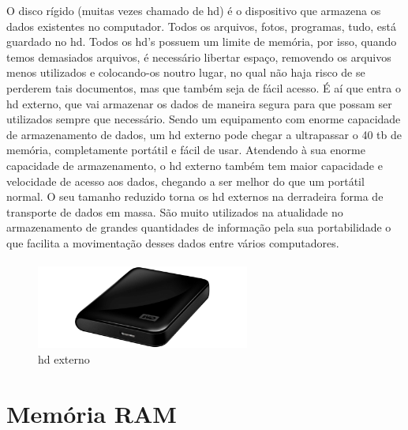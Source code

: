 \documentclass[a4paper]{report}
\begin{document}
O disco rígido (muitas vezes chamado de \ac{hd}) é o dispositivo que armazena os dados existentes no computador. Todos os arquivos, fotos, programas, tudo, está guardado no \ac{hd}. Todos os \ac{hd}’s possuem um limite de memória, por isso, quando temos demasiados arquivos, é necessário libertar espaço, removendo os arquivos menos utilizados e colocando-os noutro lugar, no qual não haja risco de se perderem tais documentos, mas que também seja de fácil acesso. É aí que entra o \ac{hd} externo, que vai armazenar os dados de maneira segura para que possam ser utilizados sempre que necessário.
Sendo um equipamento com enorme capacidade de armazenamento de dados, um \ac{hd} externo pode chegar a ultrapassar o 40 \ac{tb} de memória, completamente portátil e fácil de usar. Atendendo à sua enorme capacidade de armazenamento, o \ac{hd} externo também tem maior capacidade e velocidade de acesso aos dados, chegando a ser melhor do que um portátil normal.
O seu tamanho reduzido torna os \ac{hd} externos na derradeira forma de transporte de dados em massa. 
São muito utilizados na atualidade no armazenamento de grandes quantidades de informação pela sua portabilidade o que facilita a movimentação desses dados entre vários computadores.

\paragraph{}
\paragraph{}
\paragraph{}

\begin{figure}[H]
\center
\includegraphics[width=7cm]{Imagens/discoexterno.png}
\caption{\ac{hd} externo}
\end{figure}

\newpage

\section{Memória RAM}
\label{sect.ram}
\end{document}
